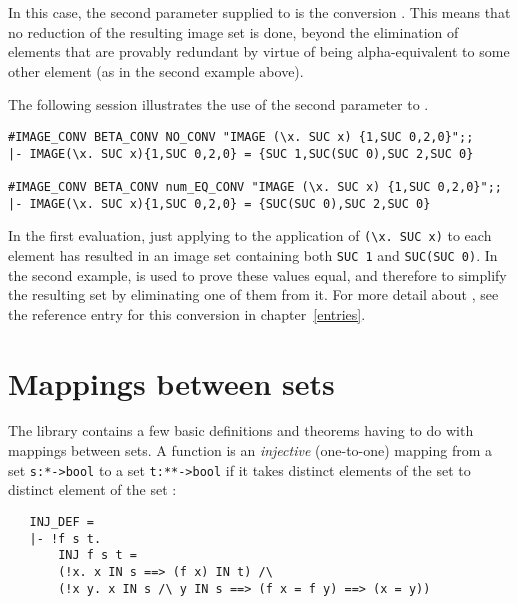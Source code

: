 \noindent In this case, the second parameter supplied to  is
the conversion . This means that no reduction of the resulting
image set is done, beyond the elimination of elements that are provably
redundant by virtue of being alpha-equivalent to some other element (as in the
second example above).

The following session illustrates the use of the second parameter to
.  

\begin{session}\begin{verbatim}
#IMAGE_CONV BETA_CONV NO_CONV "IMAGE (\x. SUC x) {1,SUC 0,2,0}";;
|- IMAGE(\x. SUC x){1,SUC 0,2,0} = {SUC 1,SUC(SUC 0),SUC 2,SUC 0}

#IMAGE_CONV BETA_CONV num_EQ_CONV "IMAGE (\x. SUC x) {1,SUC 0,2,0}";;
|- IMAGE(\x. SUC x){1,SUC 0,2,0} = {SUC(SUC 0),SUC 2,SUC 0}
\end{verbatim}\end{session}

\noindent In the first evaluation, just applying  to the
application of {\small\verb!(\x. SUC x)!} to each element has resulted in an
image set containing both {\small\verb!SUC 1!} and {\small\verb!SUC(SUC 0)!}.
In the second example,  is used to prove these values equal,
and therefore to simplify the resulting set by eliminating one of them from it.
For more detail about , see the reference entry for this
conversion in chapter~\ref{entries}.%

\section{Mappings between sets}

The  library contains a few basic definitions and theorems
having to do with mappings between sets.  A function  is an {\it
injective\/} (one-to-one) mapping from a set {\small\verb!s:*->bool!} to a set
{\small\verb!t:**->bool!} if it takes distinct elements of the set  to
distinct element of the set :

\begin{hol}
\begin{verbatim}
   INJ_DEF = 
   |- !f s t.
       INJ f s t =
       (!x. x IN s ==> (f x) IN t) /\
       (!x y. x IN s /\ y IN s ==> (f x = f y) ==> (x = y))
\end{verbatim}\end{hol}

